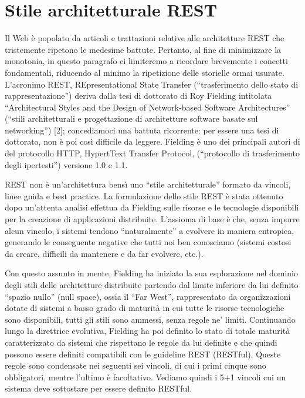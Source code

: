 \section{Stile architetturale REST}
Il Web è popolato da articoli e trattazioni relative alle architetture REST che tristemente ripetono le medesime battute. Pertanto, al fine di minimizzare la monotonia, in questo paragrafo ci limiteremo a ricordare brevemente i concetti fondamentali, riducendo al minimo la ripetizione delle storielle ormai usurate. L’acronimo REST, REpresentational State Transfer (“trasferimento dello stato di rappresentazione”) deriva dalla tesi di dottorato di Roy Fielding intitolata “Architectural Styles and the Design of Network-based Software Architectures” (“stili architetturali e progettazione di architetture software basate sul networking”) [2]; concediamoci una battuta ricorrente: per essere una tesi di dottorato, non è poi così difficile da leggere. Fielding è uno dei principali autori di del protocollo HTTP, HypertText Transfer Protocol, (“protocollo di trasferimento degli ipertesti”) versione 1.0 e 1.1.

REST non è un’architettura bensì uno “stile architetturale” formato da vincoli, linee guida e best practice. La formulazione dello stile REST è stata ottenuto dopo un’attenta analisi effettua da Fielding sulle risorse e le tecnologie disponibili per la creazione di applicazioni distribuite. L’assioma di base è che, senza imporre alcun vincolo, i sistemi tendono “naturalmente” a evolvere in maniera entropica, generando le conseguente negative che tutti noi ben conosciamo (sistemi costosi da creare, difficili da mantenere e da far evolvere, etc.).

Con questo assunto in mente, Fielding ha iniziato la sua esplorazione nel dominio degli stili delle architetture distribuite partendo dal limite inferiore da lui definito “spazio nullo” (null space), ossia il “Far West”, rappresentato da organizzazioni dotate di sistemi a basso grado di maturità in cui tutte le risorse tecnologiche sono disponibili, tutti gli stili sono ammessi, senza regole ne’ limiti. Continuando lungo la direttrice evolutiva, Fielding ha poi definito lo stato di totale maturità caratterizzato da sistemi che rispettano le regole da lui definite e che quindi possono essere definiti compatibili con le guideline REST (RESTful). Queste regole sono condensate nei seguenti sei vincoli, di cui i primi cinque sono obbligatori, mentre l’ultimo è facoltativo. Vediamo quindi i 5+1 vincoli cui un sistema deve sottostare per essere definito RESTful.
